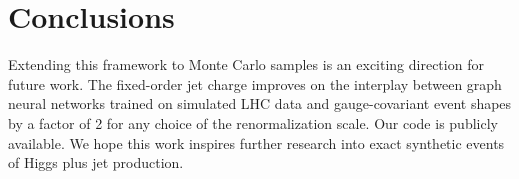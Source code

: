\section{Conclusions}\label{sec:conclusions}

Extending this framework to Monte Carlo samples is an exciting direction
for future work. The fixed-order jet charge improves on the interplay
between graph neural networks trained on simulated LHC data and
gauge-covariant event shapes by a factor of 2 for any choice of the
renormalization scale. Our code is publicly available. We hope this work
inspires further research into exact synthetic events of Higgs plus jet
production.

